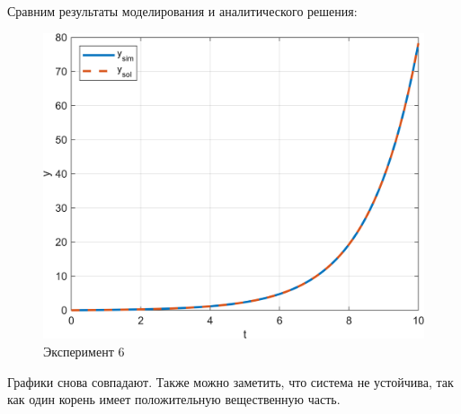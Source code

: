 Сравним результаты моделирования и аналитического решения:
\begin{figure}[H]
    \centering
    \includegraphics[width=1\textwidth, trim={0cm 0cm 0cm 0cm}]{../images/1_6.png}
    \caption{Эксперимент 6}
    \label{fig:exp6}
\end{figure}

Графики снова совпадают. Также можно заметить, что система не устойчива, так как один корень имеет положительную вещественную часть.
\endinput